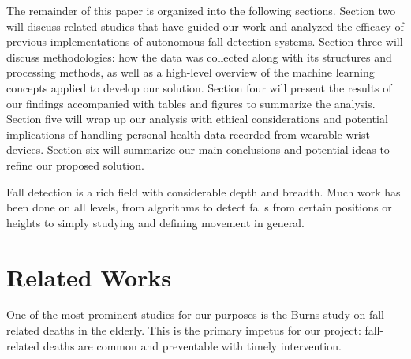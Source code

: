 \documentclass{llncs}
\begin{document}

	The remainder of this paper is organized into the following sections. Section two will discuss related studies that have guided our work and analyzed the efficacy of previous implementations of autonomous fall-detection systems. Section three will discuss methodologies: how the data was collected along with its structures and processing methods, as well as a high-level overview of the machine learning concepts applied to develop our solution. Section four will present the results of our findings accompanied with tables and figures to summarize the analysis. Section five will wrap up our analysis with ethical considerations and potential implications of handling personal health data recorded from wearable wrist devices. Section six will summarize our main conclusions and potential ideas to refine our proposed solution. 

Fall detection is a rich field with considerable depth and breadth. Much work has been done on all levels, from algorithms to detect falls from certain positions or heights to simply studying and defining movement in general.
\section{Related Works}
  One of the most prominent studies for our purposes is the Burns study on fall-related deaths in the elderly.\cite{burns2018deaths} This is the primary impetus for our project: fall-related deaths are common and preventable with timely intervention.
    
\end{document}
